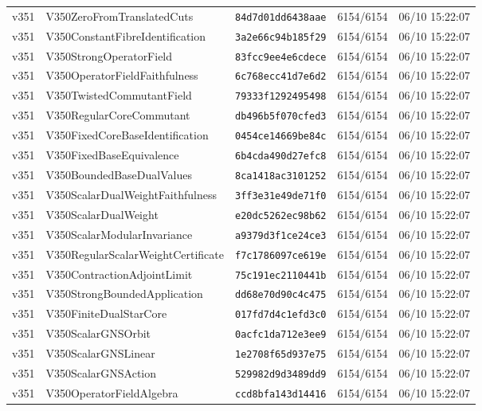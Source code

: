 \documentclass[11pt]{article}
\theoremstyle{definition}\newtheorem{deriv}{Derivação}
\begin{document}
{\begin{longtable}{@{}lllll@{}}
v351 & V350ZeroFromTranslatedCuts & \texttt{84d7d01dd6438aae} & 6154/6154 & 06/10 15:22:07 \\
v351 & V350ConstantFibreIdentification & \texttt{3a2e66c94b185f29} & 6154/6154 & 06/10 15:22:07 \\
v351 & V350StrongOperatorField & \texttt{83fcc9ee4e6cdece} & 6154/6154 & 06/10 15:22:07 \\
v351 & V350OperatorFieldFaithfulness & \texttt{6c768ecc41d7e6d2} & 6154/6154 & 06/10 15:22:07 \\
v351 & V350TwistedCommutantField & \texttt{79333f1292495498} & 6154/6154 & 06/10 15:22:07 \\
v351 & V350RegularCoreCommutant & \texttt{db496b5f070cfed3} & 6154/6154 & 06/10 15:22:07 \\
v351 & V350FixedCoreBaseIdentification & \texttt{0454ce14669be84c} & 6154/6154 & 06/10 15:22:07 \\
v351 & V350FixedBaseEquivalence & \texttt{6b4cda490d27efc8} & 6154/6154 & 06/10 15:22:07 \\
v351 & V350BoundedBaseDualValues & \texttt{8ca1418ac3101252} & 6154/6154 & 06/10 15:22:07 \\
v351 & V350ScalarDualWeightFaithfulness & \texttt{3ff3e31e49de71f0} & 6154/6154 & 06/10 15:22:07 \\
v351 & V350ScalarDualWeight & \texttt{e20dc5262ec98b62} & 6154/6154 & 06/10 15:22:07 \\
v351 & V350ScalarModularInvariance & \texttt{a9379d3f1ce24ce3} & 6154/6154 & 06/10 15:22:07 \\
v351 & V350RegularScalarWeightCertificate & \texttt{f7c1786097ce619e} & 6154/6154 & 06/10 15:22:07 \\
v351 & V350ContractionAdjointLimit & \texttt{75c191ec2110441b} & 6154/6154 & 06/10 15:22:07 \\
v351 & V350StrongBoundedApplication & \texttt{dd68e70d90c4c475} & 6154/6154 & 06/10 15:22:07 \\
v351 & V350FiniteDualStarCore & \texttt{017fd7d4c1efd3c0} & 6154/6154 & 06/10 15:22:07 \\
v351 & V350ScalarGNSOrbit & \texttt{0acfc1da712e3ee9} & 6154/6154 & 06/10 15:22:07 \\
v351 & V350ScalarGNSLinear & \texttt{1e2708f65d937e75} & 6154/6154 & 06/10 15:22:07 \\
v351 & V350ScalarGNSAction & \texttt{529982d9d3489dd9} & 6154/6154 & 06/10 15:22:07 \\
v351 & V350OperatorFieldAlgebra & \texttt{ccd8bfa143d14416} & 6154/6154 & 06/10 15:22:07 \\

\end{longtable}}
\end{document}
